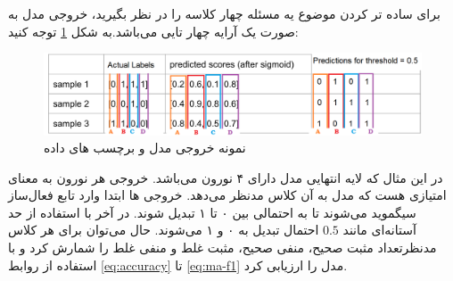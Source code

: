 برای ساده تر کردن موضوع یه مسئله چهار کلاسه را در نظر بگیرید، خروجی مدل به صورت یک آرایه چهار تایی می‌باشد.به شکل \ref{fig:evaluate} توجه کنید:
\begin{figure}[H]
	\centering
	\includegraphics[width=1\textwidth]{figures/evaluate.png}
	\caption{نمونه خروجی مدل و برچسب های داده}
	\label{fig:evaluate}
\end{figure}
در این مثال که لایه انتهایی مدل دارای ۴ نورون می‌باشد. خروجی هر نورون به معنای امتیازی  هست که مدل به آن کلاس مدنظر می‌دهد. خروجی ها ابتدا وارد تابع فعال‌ساز سیگموید می‌شوند تا به احتمالی بین ۰ تا ۱ تبدیل شوند. در آخر با استفاده از حد آستانه‌ای مانند $0.5$ احتمال تبدیل به ۰ و ۱ می‌شوند.
حال می‌توان برای هر کلاس مدنظرتعداد
مثبت صحیح،
منفی صحیح،
مثبت غلط
و منفی غلط
را شمارش کرد و با استفاده از روابط \ref{eq:accuracy} تا \ref{eq:ma-f1} مدل را ارزیابی کرد.
\clearpage
